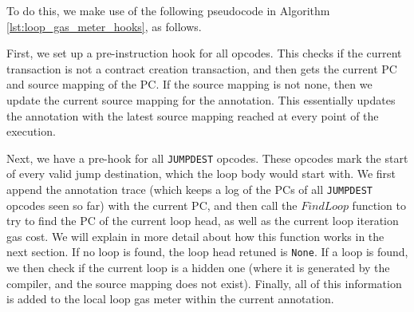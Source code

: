 To do this, we make use of the following pseudocode in Algorithm \ref{lst:loop_gas_meter_hooks},
as follows.

First, we set up a pre-instruction hook for all opcodes. This checks if the current transaction 
is not a contract creation transaction, and then gets the current PC and source mapping of the PC.
If the source mapping is not none, then we update the current source mapping for the annotation.
This essentially updates the annotation with the latest source mapping reached at every point of
the execution.

Next, we have a pre-hook for all \texttt{JUMPDEST} opcodes. These opcodes mark the start of every 
valid jump destination, which the loop body would start with. We first append the annotation
trace (which keeps a log of the PCs of all \texttt{JUMPDEST} opcodes seen so far) with the 
current PC, and then call the $\mathit{FindLoop}$ function to try to find the PC of the current loop head,
as well as the current loop iteration gas cost. We will explain in more detail about how this 
function works in the next section.
If no loop is found, the loop head retuned is \texttt{None}.
If a loop is found, we then check if the current loop is a hidden one (where it is generated by the compiler, 
and the source mapping does not exist). 
Finally, all of this information is added to the local loop gas meter within the current annotation.

